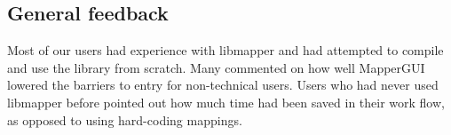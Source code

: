 

%


	\subsection{General feedback} %
	\label{sub:general_feedback}

Most of our users had experience with libmapper and had attempted to compile and use the library from scratch. Many commented on how well MapperGUI lowered the barriers to entry for non-technical users. Users who had never used libmapper before pointed out how much time had been saved in their work flow, as opposed to using hard-coding mappings.

